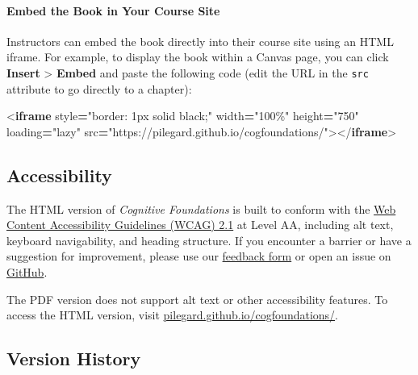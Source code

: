 \documentclass[
]{krantz}
\newenvironment{Shaded}{\begin{snugshade}}{\end{snugshade}}
\newcommand{\DataTypeTok}[1]{\textcolor[rgb]{0.13,0.29,0.53}{#1}}
\newcommand{\KeywordTok}[1]{\textcolor[rgb]{0.13,0.29,0.53}{\textbf{#1}}}
\newcommand{\OperatorTok}[1]{\textcolor[rgb]{0.81,0.36,0.00}{\textbf{#1}}}
\newcommand{\OtherTok}[1]{\textcolor[rgb]{0.56,0.35,0.01}{#1}}
\newcommand{\StringTok}[1]{\textcolor[rgb]{0.31,0.60,0.02}{#1}}
\begin{document}
\paragraph*{Embed the Book in Your Course Site}\label{embed-the-book-in-your-course-site}

Instructors can embed the book directly into their course site using an HTML iframe. For example, to display the book within a Canvas page, you can click \textbf{Insert} \textgreater{} \textbf{Embed} and paste the following code (edit the URL in the \texttt{src} attribute to go directly to a chapter):

\begin{Shaded}
\begin{Highlighting}[]
\DataTypeTok{\textless{}}\KeywordTok{iframe}
\OtherTok{  style}\OperatorTok{=}\StringTok{"border: 1px solid black;"}\OtherTok{ width}\OperatorTok{=}\StringTok{"100\%"}\OtherTok{ height}\OperatorTok{=}\StringTok{"750"}\OtherTok{ loading}\OperatorTok{=}\StringTok{"lazy"}
\OtherTok{  src}\OperatorTok{=}\StringTok{"https://pilegard.github.io/cogfoundations/"}\DataTypeTok{\textgreater{}\textless{}/}\KeywordTok{iframe}\DataTypeTok{\textgreater{}}
\end{Highlighting}
\end{Shaded}

\subsection*{Accessibility}\label{accessibility}


The HTML version of \emph{Cognitive Foundations} is built to conform with the \href{https://www.w3.org/TR/2025/REC-WCAG21-20250506/}{Web Content Accessibility Guidelines (WCAG) 2.1} at Level AA, including alt text, keyboard navigability, and heading structure. If you encounter a barrier or have a suggestion for improvement, please use our \href{https://forms.gle/83CBvAgLuJshRfz37}{feedback form} or open an issue on \href{https://github.com/pilegard/cogfoundations}{GitHub}.

The PDF version does not support alt text or other accessibility features. To access the HTML version, visit \href{https://pilegard.github.io/cogfoundations/}{pilegard.github.io/cogfoundations/}.

\subsection*{Version History}\label{version-history}
\end{document}
